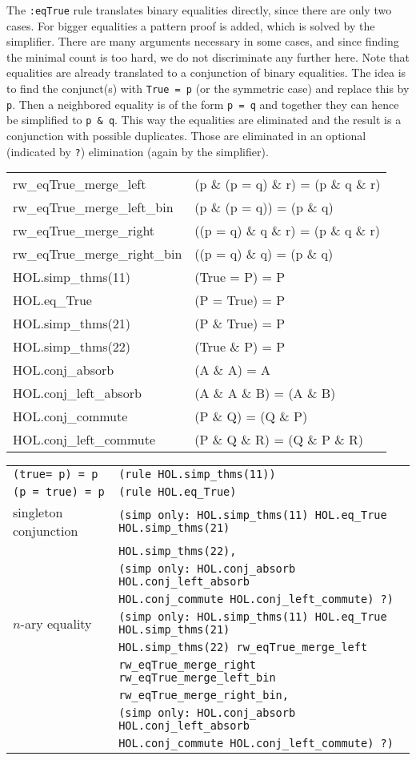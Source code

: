 \documentclass[10pt,a4paper]{article}
\newcommand{\ttt}{\texttt}
\newcommand{\true}{\ttt{true}\xspace}
\newenvironment{pt}[1]{\begin{center}\begin{tt}\begin{tabular}{#1}\hline}{\end{tabular}\end{tt}\end{center}}
\newcommand{\pl}[1]{#1 \\[1mm]}
\newcommand{\pll}[1]{#1 \\\hline}
\newenvironment{rt}{\begin{center}\begin{tabular}{|l l|}\hline}{\end{tabular}\end{center}}
\newcommand{\rl}[2]{\rm{#1} & \tt{#2} \\[1mm]}
\newcommand{\rll}[2]{\rm{#1} & \tt{#2} \\\hline}
\def\ind{\quad}
\begin{document}
The \ttt{:eqTrue} rule translates binary equalities directly, since there are only two cases. For bigger equalities a pattern proof is added, which is solved by the simplifier. There are many arguments necessary in some cases, and since finding the minimal count is too hard, we do not discriminate any further here. Note that equalities are already translated to a conjunction of binary equalities. The idea is to find the conjunct(s) with \mbox{\ttt{True = p}} (or the symmetric case) and replace this by \ttt{p}. Then a neighbored equality is of the form \mbox{\ttt{p = q}} and together they can hence be simplified to \mbox{\ttt{p \& q}}. This way the equalities are eliminated and the result is a conjunction with possible duplicates. Those are eliminated in an optional (indicated by \ttt{?}) elimination (again by the simplifier).
%
\begin{pt}{ll}
	\pl{rw\_eqTrue\_merge\_left & (p \& (p = q) \& r) = (p \& q \& r)}
	\pl{rw\_eqTrue\_merge\_left\_bin & (p \& (p = q)) = (p \& q)}
	\pl{rw\_eqTrue\_merge\_right & ((p = q) \& q \& r) = (p \& q \& r)}
	\pl{rw\_eqTrue\_merge\_right\_bin & ((p = q) \& q) = (p \& q)}
	\pl{HOL.simp\_thms(11) & (True = P) = P}
	\pl{HOL.eq\_True & (P = True) = P}
	\pl{HOL.simp\_thms(21) & (P \& True) = P}
	\pl{HOL.simp\_thms(22) & (True \& P) = P}
	\pl{HOL.conj\_absorb & (A \& A) = A}
	\pl{HOL.conj\_left\_absorb & (A \& A \& B) = (A \& B)}
	\pl{HOL.conj\_commute & (P \& Q) = (Q \& P)}
	\pll{HOL.conj\_left\_commute & (P \& Q \& R) = (Q \& P \& R)}
\end{pt}
%
\begin{rt}
	\rl{\ttt{(\true = p) = p}}{(rule HOL.simp\_thms(11))}
	\rl{\ttt{(p = \true) = p}}{(rule HOL.eq\_True)}
	\rl{singleton conjunction}{(simp only:~HOL.simp\_thms(11) HOL.eq\_True HOL.simp\_thms(21)}
		\rl{}{\ind HOL.simp\_thms(22),}
		\rl{}{(simp only:~HOL.conj\_absorb HOL.conj\_left\_absorb}
		\rl{}{\ind HOL.conj\_commute HOL.conj\_left\_commute) ?)}
	\rl{$n$-ary equality}{(simp only:~HOL.simp\_thms(11) HOL.eq\_True HOL.simp\_thms(21)}
		\rl{}{\ind HOL.simp\_thms(22) rw\_eqTrue\_merge\_left}
		\rl{}{\ind rw\_eqTrue\_merge\_right rw\_eqTrue\_merge\_left\_bin}
		\rl{}{\ind rw\_eqTrue\_merge\_right\_bin,}
		\rl{}{(simp only:~HOL.conj\_absorb HOL.conj\_left\_absorb}
		\rll{}{\ind HOL.conj\_commute HOL.conj\_left\_commute) ?)}
\end{rt}
\end{document}
